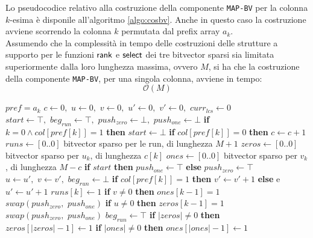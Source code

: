 Lo pseudocodice relativo alla costruzione della componente \texttt{MAP-BV} per
la colonna $k$-esima è disponile all'algoritmo \ref{algo:cosbv}. Anche in questo
caso la costruzione avviene scorrendo la colonna $k$ permutata dal
prefix array $a_k$. \\ 
Assumendo che la complessità in tempo delle costruzioni delle
strutture a supporto per le funzioni $\mbox{\rm {\sf rank}}$ e $\mbox{\rm {\sf select}}$ dei tre
bitvector sparsi sia limitata superiormente dalla loro lunghezza massima, ovvero
$M$, si ha che la costruzione della componente \texttt{MAP-BV}, per una singola
colonna, avviene in tempo:
\begin{equation}
  \label{eq:bvcos}
  \mathcal{O}(M)
\end{equation}
\begin{algorithm}
  \small
  \begin{algorithmic}[1]
    \Comment $pref=a_k$
    \State $c\gets 0,\,\,u\gets 0,\,\,v\gets 0,\,\,u'\gets 0,\,\, v'\gets
    0,\,\,curr_{lcs}\gets 0$
    \State $start \gets \top,\,\,beg_{run}\gets \top,\,\,push_{zero}\gets
    \bot,\,\,push_{one}\gets \bot$
    \For {\textit{every} $k\in\left[0,\,\, M\right)$}
    \State \textbf{if} $k=0\land col[pref[k]]=1$ \textbf{then} $start \gets
    \bot$  
    \State \textbf{if} $col[pref[k]]=0$ \textbf{then}  $c\gets c+1$
    \EndFor
    \State $runs\gets[0..0]$
    \Comment bitvector sparso per le run, di lunghezza $M+1$
    \State $zeros\gets[0..0]$
    \Comment bitvector sparso per $u_k$, di lunghezza $c[k]$
    \State $ones\gets[0..0]$
    \Comment bitvector sparso per $v_k$, di lunghezza $M-c$
    \State \textbf{if} $start$ \textbf{then} $push_{one}\gets \top$
    \textbf{else} $push_{zero}\gets \top$ 
    \For {\textit{every} $k\in\left[0,\,\, M\right)$}
    \State $u\gets u',\,\,v\gets v',\,\,beg_{run}\gets \bot$
    \EndIf
    \State \textbf{if} $col[pref[k]]=1$ \textbf{then} $v'\gets v'+1$
    \textbf{else} e $u'\gets u'+1$   
    \State $runs[k]\gets 1$
    \State \textbf{if} $v\neq 0$ \textbf{then} $ones[k-1]=1$
    \State $swap(push_{zero},\,\,push_{one})$
    \Else
    \State \textbf{if} $u\neq 0$ \textbf{then} $zeros[k-1]=1$
    \State $swap(push_{zero},\,\,push_{one})$
    \EndIf
    \State $beg_{run}\gets \top$
    \EndIf
    \EndFor
    \State \textbf{if} $|zeros|\neq 0$ \textbf{then} $zeros[|zeros|-1]\gets 1$
    \State \textbf{if} $|ones|\neq 0$ \textbf{then} $ones[|ones|-1]\gets 1$
    

\end{algorithmic}
\end{algorithm}
